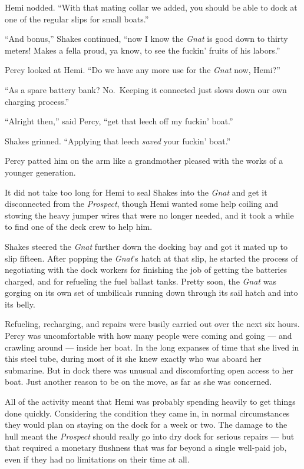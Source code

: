\documentclass[
]{scrbook}
\begin{document}
Hemi nodded. ``With that mating collar we added, you should be able to
dock at one of the regular slips for small boats.''

``And bonus,'' Shakes continued, ``now I know the \emph{Gnat} is good
down to thirty meters! Makes a fella proud, ya know, to see the fuckin'
fruits of his labors.''

Percy looked at Hemi. ``Do we have any more use for the \emph{Gnat} now,
Hemi?''

``As a spare battery bank? No.~Keeping it connected just slows down our
own charging process.''

``Alright then,'' said Percy, ``get that leech off my fuckin' boat.''

Shakes grinned. ``Applying that leech \emph{saved} your fuckin' boat.''

Percy patted him on the arm like a grandmother pleased with the works of
a younger generation.

It did not take too long for Hemi to seal Shakes into the \emph{Gnat}
and get it disconnected from the \emph{Prospect}, though Hemi wanted
some help coiling and stowing the heavy jumper wires that were no longer
needed, and it took a while to find one of the deck crew to help him.

Shakes steered the \emph{Gnat} further down the docking bay and got it
mated up to slip fifteen. After popping the \emph{Gnat}'s hatch at that
slip, he started the process of negotiating with the dock workers for
finishing the job of getting the batteries charged, and for refueling
the fuel ballast tanks. Pretty soon, the \emph{Gnat} was gorging on its
own set of umbilicals running down through its sail hatch and into its
belly.

\bigskip

Refueling, recharging, and repairs were busily carried out over the next
six hours. Percy was uncomfortable with how many people were coming and
going --- and crawling around --- inside her boat. In the long expanses
of time that she lived in this steel tube, during most of it she knew
exactly who was aboard her submarine. But in dock there was unusual and
discomforting open access to her boat. Just another reason to be on the
move, as far as she was concerned.

All of the activity meant that Hemi was probably spending heavily to get
things done quickly. Considering the condition they came in, in normal
circumstances they would plan on staying on the dock for a week or two.
The damage to the hull meant the \emph{Prospect} should really go into
dry dock for serious repairs --- but that required a monetary flushness
that was far beyond a single well-paid job, even if they had no
limitations on their time at all.
\end{document}
